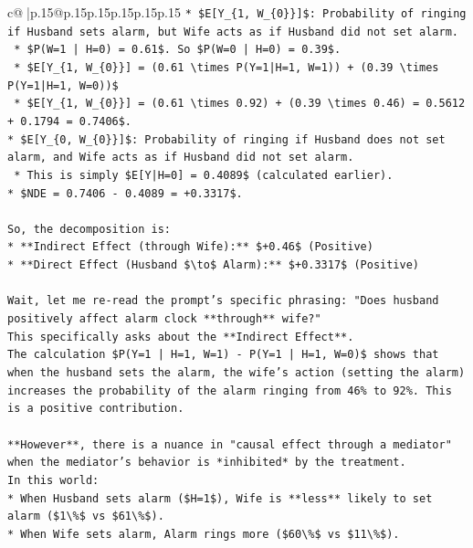 \documentclass{article}
\begin{document}
{\begin{supertabular}{c@{$\;$}|p{.15\linewidth}@{}p{.15\linewidth}p{.15\linewidth}p{.15\linewidth}p{.15\linewidth}p{.15\linewidth}}
{{{\texttt{*   \$E{[}Y\_\{1, W\_\{0\}\}{]}\$: Probability of ringing if Husband sets alarm, but Wife acts as if Husband did not set alarm.} \\
\texttt{    *   \$P(W=1 | H=0) = 0.61\$. So \$P(W=0 | H=0) = 0.39\$.} \\
\texttt{    *   \$E{[}Y\_\{1, W\_\{0\}\}{]} = (0.61 \textbackslash{}times P(Y=1|H=1, W=1)) + (0.39 \textbackslash{}times P(Y=1|H=1, W=0))\$} \\
\texttt{    *   \$E{[}Y\_\{1, W\_\{0\}\}{]} = (0.61 \textbackslash{}times 0.92) + (0.39 \textbackslash{}times 0.46) = 0.5612 + 0.1794 = 0.7406\$.} \\
\texttt{*   \$E{[}Y\_\{0, W\_\{0\}\}{]}\$: Probability of ringing if Husband does not set alarm, and Wife acts as if Husband did not set alarm.} \\
\texttt{    *   This is simply \$E{[}Y|H=0{]} = 0.4089\$ (calculated earlier).} \\
\texttt{*   \$NDE = 0.7406 {-} 0.4089 = +0.3317\$.} \\
\\ 
\texttt{So, the decomposition is:} \\
\texttt{*   **Indirect Effect (through Wife):** \$+0.46\$ (Positive)} \\
\texttt{*   **Direct Effect (Husband \$\textbackslash{}to\$ Alarm):** \$+0.3317\$ (Positive)} \\
\\ 
\texttt{Wait, let me re{-}read the prompt's specific phrasing: "Does husband positively affect alarm clock **through** wife?"} \\
\texttt{This specifically asks about the **Indirect Effect**.} \\
\texttt{The calculation \$P(Y=1 | H=1, W=1) {-} P(Y=1 | H=1, W=0)\$ shows that when the husband sets the alarm, the wife's action (setting the alarm) increases the probability of the alarm ringing from 46\% to 92\%. This is a positive contribution.} \\
\\ 
\texttt{**However**, there is a nuance in "causal effect through a mediator" when the mediator's behavior is *inhibited* by the treatment.} \\
\texttt{In this world:} \\
\texttt{*   When Husband sets alarm (\$H=1\$), Wife is **less** likely to set alarm (\$1\textbackslash{}\%\$ vs \$61\textbackslash{}\%\$).} \\
\texttt{*   When Wife sets alarm, Alarm rings more (\$60\textbackslash{}\%\$ vs \$11\textbackslash{}\%\$).} \\
}}}
\end{supertabular}}
\end{document}

